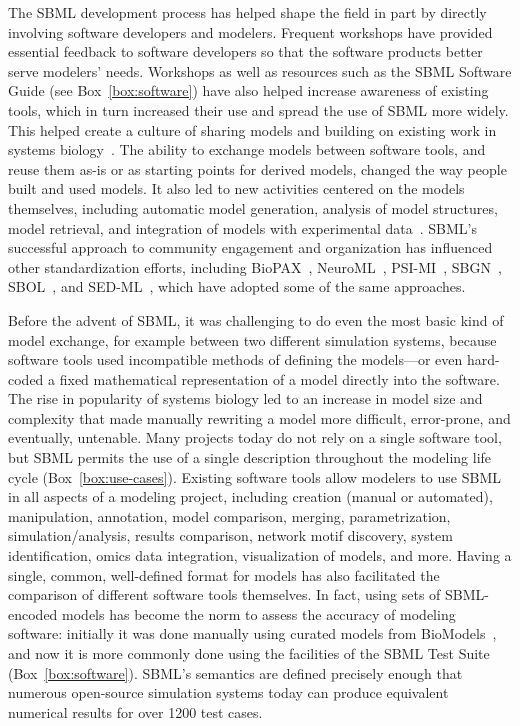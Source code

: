 \documentclass[]{draft-sbml-paper}
\begin{document}
The SBML development process has helped shape the field in part by directly involving software developers and modelers.  Frequent workshops have provided essential feedback to software developers so that the software products better serve modelers' needs.  Workshops as well as resources such as the SBML Software Guide (see Box~\ref{box:software}) have also helped increase awareness of existing tools, which in turn increased their use and spread the use of SBML more widely.  This helped create a culture of sharing models and building on existing work in systems biology~\citep{stanford2015evolution}.  The ability to exchange models between software tools, and reuse them as-is or as starting points for derived models, changed the way people built and used models.  It also led to new activities centered on the models themselves, including automatic model generation, analysis of model structures, model retrieval, and integration of models with experimental data~\citep{Draeger2014}.  SBML's successful approach to community engagement and organization has influenced other standardization efforts, including BioPAX~\citep{Demir2010}, NeuroML~\citep{Gleeson2010}, PSI-MI~\citep{hermjakob2004the}, SBGN~\citep{VanIersel2012}, SBOL~\citep{Roehner2016}, and SED-ML~\citep{waltemath2011reproducible}, which have adopted some of the same approaches.

Before the advent of SBML, it was challenging to do even the most basic kind of model exchange, for example between two different simulation systems, because software tools used incompatible methods of defining the models---or even hard-coded a fixed mathematical representation of a model directly into the software.  The rise in popularity of systems biology led to an increase in model size and complexity that made manually rewriting a model more difficult, error-prone, and eventually, untenable.  Many projects today do not rely on a single software tool, but SBML permits the use of a single description throughout the modeling life cycle (Box~\ref{box:use-cases}).  Existing software tools allow modelers to use SBML in all aspects of a modeling project, including creation (manual or automated), manipulation, annotation, model comparison, merging, parametrization, simulation/analysis, results comparison, network motif discovery, system identification, omics data integration, visualization of models, and more.  Having a single, common, well-defined format for models has also facilitated the comparison of different software tools themselves.  In fact, using sets of SBML-encoded models has become the norm to assess the accuracy of modeling software: initially it was done manually using curated models from BioModels~\citep{bergmann2008comparing}, and now it is more commonly done using the facilities of the SBML Test Suite (Box~\ref{box:software}).  SBML's semantics are defined precisely enough that numerous open-source simulation systems today can produce equivalent numerical results for over 1200 test cases.
\end{document}
